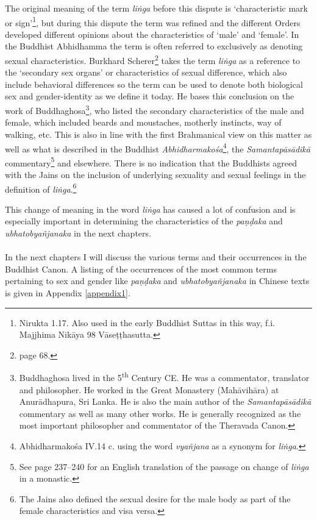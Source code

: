 The original meaning of the term {\em liṅga} before this dispute is `characteristic mark or sign'\footnote{Nirukta 1.17. Also used in the early Buddhist Suttas in this way, f.i. Majjhima Nikāya 98 Vāseṭṭhasutta.}, but during this dispute the term was refined and the different Orders developed different opinions about the characteristics of `male' and `female'. In the Buddhist Abhidhamma the term is often referred to exclusively as denoting sexual characteristics. Burkhard Scherer\footnote{\cite{scherer} page 68.} takes the term {\em liṅga} as a reference to the `secondary sex organs' or characteristics of sexual difference, which also include behavioral differences so the term can be used to denote both biological sex and gender-identity as we define it today. He bases this conclusion on the work of Buddhaghosa\footnote{Buddhaghosa lived in the 5\textsuperscript{th} Century CE. He was a commentator, translator and philosopher. He worked in the Great Monastery (Mahāvihāra) at Anurādhapura, Sri Lanka. He is also the main author of the {\em Samantapāsādikā} commentary as well as many other works. He is generally recognized as the most important philosopher and commentator of the Theravada Canon.}, who listed the secondary characteristics of the male and female, which included beards and moustaches, motherly instincts, way of walking, etc. This is also in line with the first Brahmanical view on this matter as well as what is described in the Buddhist {\em Abhidharmakośa}\footnote{Abhidharmakośa IV.14 c. using the word {\em vyañjana} as a synonym for {\em liṅga}.}, the {\em Samantapāsādikā} commentary\footnote{See \cite{anderson2016} page 237–240 for an English translation of the passage on change of {\em liṅga} in a monastic.} and elsewhere. There is no indication that the Buddhists agreed with the Jains on the inclusion of underlying sexuality and sexual feelings in the definition of {\em liṅga}.\footnote{The Jains also defined the sexual desire for the male body as part of the female characteristics and visa versa.}

This change of meaning in the word {\em liṅga} has caused a lot of confusion and is especially important in determining the characteristics of the {\em paṇḍaka} and {\em ubhatob­yañ­janaka} in the next chapters.\\
\\
In the next chapters I will discuss the various terms and their occurrences in the Buddhist Canon. A listing of the occurrences of the most common terms pertaining to sex and gender like {\em paṇḍaka} and {\em ubhatob­yañ­janaka} in Chinese texts is given in Appendix \ref{appendix1}. 
